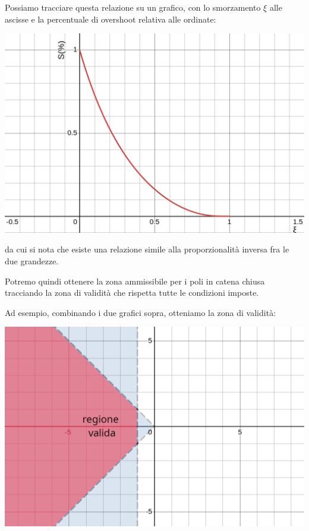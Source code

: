 \documentclass[a4paper,11pt]{article}
\begin{document}
\begin{itemize}
		Possiamo tracciare questa relazione su un grafico, con lo smorzamento $\xi$ alle ascisse e la percentuale di overshoot relativa alle ordinate:
		\begin{center}
			\includegraphics[scale=0.28]{../figures/damping_overshoot.png}
		\end{center}
		da cui si nota che esiste una relazione simile alla proporzionalità inversa fra le due grandezze.
\end{itemize}

Potremo quindi ottenere la zona ammissibile per i poli in catena chiusa tracciando la zona di validità che rispetta tutte le condizioni imposte.

\noindent
\begin{minipage}{\textwidth}

	Ad esempio, combinando i due grafici sopra, otteniamo la zona di validità:

	\begin{center}
		\includegraphics[scale=0.28]{../figures/valid_rlocus_region.png}
	\end{center}

\end{minipage}
\end{document}
